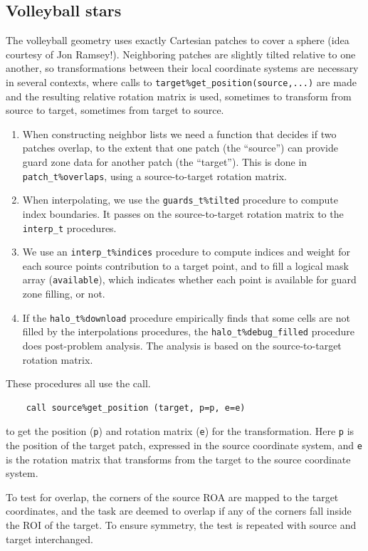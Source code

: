 \documentclass[paper=a4,fontsize=11pt]{scrartcl}
\numberwithin{equation}{section}		%
\numberwithin{figure}{section}			%
\numberwithin{table}{section}				%
\newcommand{\codecolor}{\color{Blue}}
\newcommand{\Code}[1]{{\codecolor\texttt{#1}}}
\begin{document}
\subsection{Volleyball stars}
The volleyball geometry uses exactly Cartesian patches to cover a sphere (idea courtesy of Jon Ramsey!).  Neighboring patches are slightly tilted relative to one another, so transformations between their local coordinate systems are necessary in several contexts, where calls to \Code{target\%get\_position(source,...)} are made and the resulting relative rotation matrix is used, sometimes to transform from source to target, sometimes from target to source.
\begin{enumerate}
    \item When constructing neighbor lists we need a function that decides if two patches overlap, to the extent that one patch (the ``source'') can provide guard zone data for another patch (the ``target'').  This is done in \Code{patch\_t\%overlaps}, using
    a source-to-target rotation matrix.
    \item When interpolating, we use the \Code{guards\_t\%tilted} procedure to compute index boundaries.  It passes on the source-to-target rotation matrix to the \Code{interp\_t} procedures.
    \item We use an \Code{interp\_t\%indices} procedure to compute indices and weight for each source points contribution to a target point, and to fill a logical mask array (\Code{available}), which indicates whether each point is available for guard zone filling, or not.
    \item If the \Code{halo\_t\%download} procedure empirically finds that some cells are not filled by the interpolations procedures, the \Code{halo\_t\%debug\_filled} procedure does post-problem analysis.  The analysis is based on the source-to-target rotation matrix.
\end{enumerate}
These procedures all use the call.
{\codecolor\small\begin{verbatim}
    call source%get_position (target, p=p, e=e)
\end{verbatim}}
to get the position (\Code{p}) and rotation matrix (\Code{e}) for the transformation.  Here \Code{p} is the position of the target patch, expressed in the source coordinate system, and  \Code{e} is the rotation matrix that transforms from the target to the source coordinate system.

To test for overlap, the corners of the source ROA are mapped to the target coordinates, and the task are deemed to overlap if any of the corners fall inside the ROI of the target.  To ensure symmetry, the test is repeated with source and target interchanged.
\end{document}

